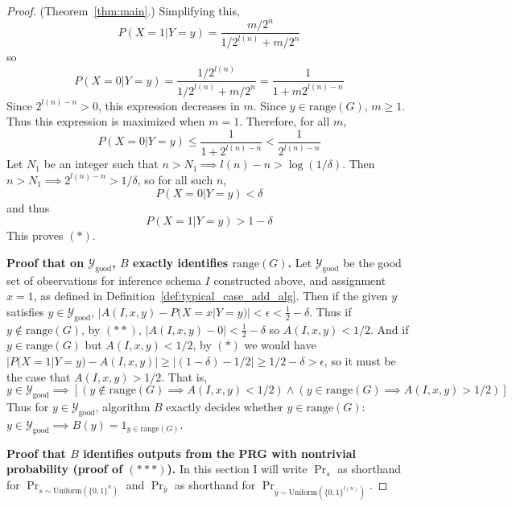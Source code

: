 \documentclass{article}
\def \Ygood{\mathcal{Y}_\text{good}}
\theoremstyle{definition}
\theoremstyle{remark}
\begin{document}
\begin{proof}{(Theorem~\ref{thm:main}.)}
Simplifying this, 
$$
P(X = 1 | Y = y) = \frac{
    m/2^n
}{
    1/2^{l(n)} + m/2^n
}
$$
so
$$
P(X = 0 | Y = y) = \frac{
    1/2^{l(n)}
}{
    1/2^{l(n)} + m/2^n
} = \frac{1}{1 + m 2^{l(n) - n}}
$$
Since $2^{l(n) - n} > 0$, this expression decreases in $m$.
Since $y \in \text{range}(G)$, $m \geq 1$.
Thus this expression is maximized when $m = 1$.
Therefore, for all $m$,
$$
P(X = 0 | Y = y) \leq \frac{1}{1 + 2^{l(n) - n}} < \frac{1}{2^{l(n) - n}}
$$
Let $N_1$ be an integer such that
$n > N_1 \implies l(n) - n > \log(1/\delta)$.
Then $n > N_1 \implies 2^{l(n) - n} > 1/\delta$,
so for all such $n$,
$$
P(X = 0 | Y = y) < \delta
$$
and thus
$$
P(X = 1 | Y = y) > 1 - \delta
$$
This proves $(*)$.

\medskip
\noindent \textbf{Proof that on $\Ygood$, $B$ exactly identifies $\text{range}(G)$.}
Let $\Ygood$ be the good set of observations for inference schema $I$ constructed above, and assignment $x = 1$, as defined in Definition~\ref{def:typical_case_add_alg}.
Then if the given $y$ satisfies $y \in \Ygood$, $|A(I, x, y) - P(X = x | Y = y)| < \epsilon < \frac{1}{2} - \delta$.
Thus if $y \notin \text{range}(G)$, by $(**)$, $|A(I, x, y) - 0| < \frac{1}{2} - \delta$ so $A(I, x, y) < 1/2$.
And if $y \in \text{range}(G)$ but $A(I, x, y) < 1/2$, by $(*)$ we would have $|P(X = 1 | Y = y) - A(I, x, y)| \geq |(1 - \delta) - 1/2| \geq 1/2 - \delta > \epsilon$, so it must be the case that $A(I, x, y) > 1/2$.
That is,
$$
y \in \Ygood \implies [(y \notin \text{range}(G) \implies A(I, x, y) < 1/2) \wedge (y \in \text{range}(G) \implies A(I, x, y) > 1/2)]
$$
Thus for $y \in \Ygood$, algorithm $B$ exactly decides whether $y \in \text{range}(G)$: $y \in \Ygood \implies B(y) = 1_{y \in \text{range}(G)}$.

\medskip
\noindent \textbf{Proof that $B$ identifies outputs from the PRG with nontrivial probability (proof of $(***)$).}
In this section I will write $\Pr_s$ as shorthand for $\Pr_{s \sim \text{Uniform}(\{0, 1\}^n)}$ and $\Pr_{\bar{y}}$ as shorthand for $\Pr_{\bar{y} \sim \text{Uniform}(\{0, 1\}^{l(n)})}$.


\end{proof}
\end{document}
